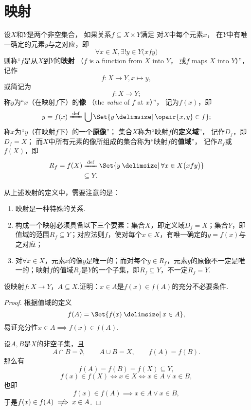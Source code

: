 \section{映射}
\begin{definition}
设\(X\)和\(Y\)是两个非空集合，%
如果关系\(f \subseteq X \times Y\)满足%
对\(X\)中每个元素\(x\)，%
在\(Y\)中有唯一确定的元素\(y\)与之对应，即\[
\forall x \in X,
\exists! y \in Y
\bigl( x f y \bigr)
\]则称“\(f\)是从\(X\)到\(Y\)的\textbf{映射}%
（\(f\) is a function from \(X\) into \(Y\)，%
或\(f\) maps \(X\) into \(Y\)）”，记作\[
f\colon X \to Y, x \mapsto y,
\]或简记为\[
f\colon X \to Y;
\]
称\(y\)为“\(x\)（在映射\(f\)下）的\textbf{像}%
（the \emph{value} of \(f\) at \(x\)）”，%
记为\(f(x)\)，即\[
y = f(x)
\defeq \bigcup\Set{ y \given \opair{x,y} \in f };
\]
称\(x\)为“\(y\)（在映射\(f\)下）的一个\textbf{原像}”；
集合\(X\)称为“映射\(f\)的\textbf{定义域}”，%
记作\(D_f\)，即\(D_f = X\)；
而\(X\)中所有元素的像所组成的集合称为“映射\(f\)的\textbf{值域}”，%
记作\(R_f\)或\(f(X)\)，即\[\begin{aligned}
R_f = f(X)
&\defeq \Set{ y \given \forall x \in X \bigl( x f y \bigr) } \\
&\subseteq Y.
\end{aligned}\]
\end{definition}

从上述映射的定义中，需要注意的是：
\begin{enumerate}
\item 映射是一种特殊的关系.
\item 构成一个映射必须具备以下三个要素：集合\(X\)，即定义域\(D_f = X\)；集合\(Y\)，即值域的范围\(R_f \subseteq Y\)；对应法则\(f\)，使对每个\(x \in X\)，有唯一确定的\(y=f(x)\)与之对应；
\item 对\(\forall x \in X\)，元素\(x\)的像\(y\)是唯一的；而对每个\(y \in R_f\)，元素\(y\)的原像不一定是唯一的；映射\(f\)的值域\(R_f\)是\(Y\)的一个子集，即\(R_f \subseteq Y\)，不一定\(R_f = Y\).
\end{enumerate}

\begin{example}
设映射\(f\colon X \to Y\)，\(A \subseteq X\).证明：\(x \in A\)是\(f(x) \in f(A)\)的充分不必要条件.
\begin{proof}
根据值域的定义\[
f(A) = \Set{ f(x) \given x \in A },
\]易证充分性\(x \in A \implies f(x) \in f(A)\).

设\(A,B\)是\(X\)的非空子集，且\[
A \cap B = \emptyset,
\qquad
A \cup B = X,
\qquad
f(A) = f(B).
\]那么有\[
f(A) = f(B) = f(X) \subseteq Y,
\]\[
f(x) \in f(X) \iff x \in X \iff x \in A \lor x \in B,
\]也即\[
f(x) \in f(A) \implies x \in A \lor x \in B,
\]于是\(f(x) \in f(A) \notimplies x \in A\).
\end{proof}
\end{example}

